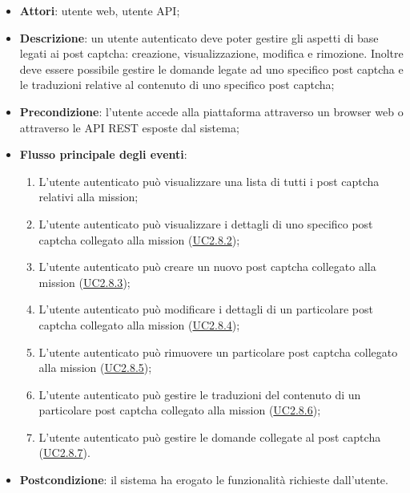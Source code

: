 \begin{itemize}
\item \textbf{Attori}: utente web, utente API;
\item \textbf{Descrizione}: un utente autenticato deve poter gestire gli aspetti di base legati ai post captcha: creazione, visualizzazione, modifica e rimozione. Inoltre deve essere possibile gestire le domande legate ad uno specifico post captcha e le traduzioni relative al contenuto di uno specifico post captcha; 
      \item \textbf{Precondizione}: l'utente accede alla piattaforma attraverso un browser web o attraverso le API REST esposte dal sistema;

        \item \textbf{Flusso principale degli eventi}:
          \begin{enumerate}
          \item L'utente autenticato può visualizzare una lista di tutti i post captcha relativi alla mission;
          \item L'utente autenticato può visualizzare i dettagli di uno specifico post captcha collegato alla mission (\hyperlink{UC2.8.2}{UC2.8.2});
          \item L'utente autenticato può creare un nuovo post captcha collegato alla mission (\hyperlink{UC2.8.3}{UC2.8.3});
          \item L'utente autenticato può modificare i dettagli di un particolare post captcha collegato alla mission (\hyperlink{UC2.8.4}{UC2.8.4});
          \item L'utente autenticato può rimuovere un particolare post captcha collegato alla mission (\hyperlink{UC2.8.5}{UC2.8.5});
          \item L'utente autenticato può gestire le traduzioni del contenuto di un particolare post captcha collegato alla mission (\hyperlink{UC2.8.6}{UC2.8.6});
          \item L'utente autenticato può gestire le domande collegate al post captcha (\hyperlink{UC2.8.7}{UC2.8.7}).

      \end{enumerate}
    \item \textbf{Postcondizione}: il sistema ha erogato le funzionalità richieste dall'utente.
  \end{itemize}

\hypertarget{UC2.8.2}{}
